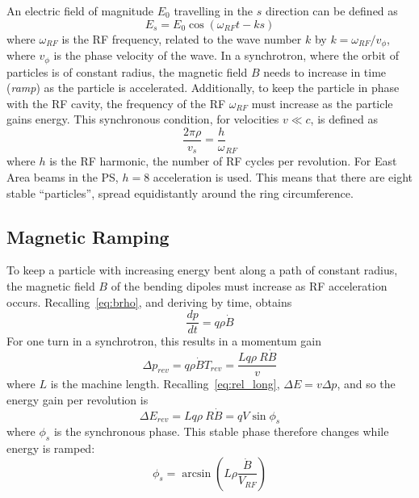 \documentclass[11pt]{report}
\begin{document}
An electric field of magnitude $E_0$ travelling in the $s$ direction can be defined as
\begin{equation}
  E_s = E_0\cos(\omega_{RF}t-ks)
\end{equation} where $\omega_{RF}$ is the RF frequency, related to the wave number $k$ by $k=\omega_{RF}/v_\phi$, where $v_\phi$ is the phase velocity of the wave. In a synchrotron, where the orbit of particles is of constant radius, the magnetic field $B$ needs to increase in time (\textit{ramp}) as the particle is accelerated. Additionally, to keep the particle in phase with the RF cavity, the frequency of the RF $\omega_{RF}$ must increase as the particle gains energy. This synchronous condition, for velocities $v\ll c$, is defined as
\begin{equation}
  \frac{2\pi\rho}{v_s}=\frac h\omega_{RF}
\end{equation} where $h$ is the RF harmonic, the number of RF cycles per revolution. For East Area beams in the PS, $h=8$ acceleration is used. This means that there are eight stable ``particles'', spread equidistantly around the ring circumference. 

\subsection{Magnetic Ramping}

To keep a particle with increasing energy bent along a path of constant radius, the magnetic field $B$ of the bending dipoles must increase as RF acceleration occurs. Recalling~\autoref{eq:brho}, and deriving by time, obtains
\begin{equation}
  \frac{dp}{dt} = q\rho\dot B
\end{equation}
For one turn in a synchrotron, this results in a momentum gain
\begin{equation}
  \Delta p_{rev} = q\rho\dot B T_{rev}=\frac{Lq\rho~R\dot B}v
\end{equation} where $L$ is the machine length. Recalling~\autoref{eq:rel_long}, $\Delta E=v\Delta p$, and so the energy gain per revolution is
\begin{equation}
  \Delta E_{rev} = Lq\rho~R\dot B=qV\sin \phi_s
\end{equation} where $\phi_s$ is the synchronous phase. This stable phase therefore changes while energy is ramped:
\begin{equation}
  \phi_s=\arcsin\left(L\rho\frac{\dot B}{V_{RF}}\right)
\end{equation}
\end{document}
